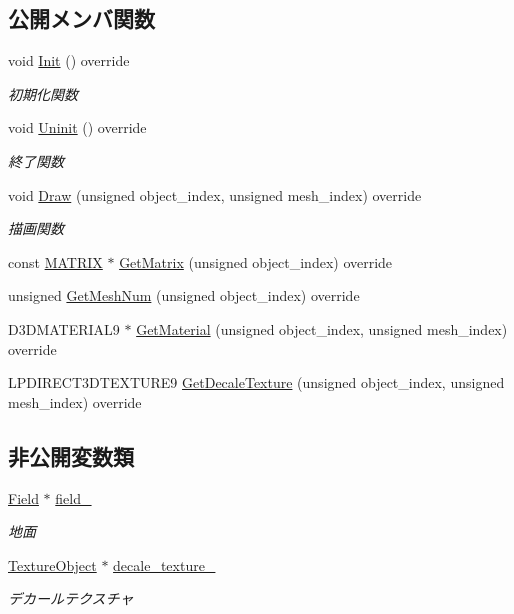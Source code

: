\subsection*{公開メンバ関数}
\begin{DoxyCompactItemize}
\item 
void \mbox{\hyperlink{class_field_draw_a4287d2ce33033b2413c1d3a81b173373}{Init}} () override
\begin{DoxyCompactList}\small\item\em 初期化関数 \end{DoxyCompactList}\item 
void \mbox{\hyperlink{class_field_draw_a89a78212c141714d9e39e25e663aaeff}{Uninit}} () override
\begin{DoxyCompactList}\small\item\em 終了関数 \end{DoxyCompactList}\item 
void \mbox{\hyperlink{class_field_draw_a1915497654d079074dbd3e058db06a78}{Draw}} (unsigned object\+\_\+index, unsigned mesh\+\_\+index) override
\begin{DoxyCompactList}\small\item\em 描画関数 \end{DoxyCompactList}\item 
const \mbox{\hyperlink{_vector3_d_8h_a032295cd9fb1b711757c90667278e744}{M\+A\+T\+R\+IX}} $\ast$ \mbox{\hyperlink{class_field_draw_a2629b4c4cd8e240e39c65b879c6e82b6}{Get\+Matrix}} (unsigned object\+\_\+index) override
\item 
unsigned \mbox{\hyperlink{class_field_draw_aeb54d8cba559ef615ee46c8a7bbd3b9f}{Get\+Mesh\+Num}} (unsigned object\+\_\+index) override
\item 
D3\+D\+M\+A\+T\+E\+R\+I\+A\+L9 $\ast$ \mbox{\hyperlink{class_field_draw_ab126f938895211ff170bc37045a8e7a2}{Get\+Material}} (unsigned object\+\_\+index, unsigned mesh\+\_\+index) override
\item 
L\+P\+D\+I\+R\+E\+C\+T3\+D\+T\+E\+X\+T\+U\+R\+E9 \mbox{\hyperlink{class_field_draw_a67eabcc5ffd6697b87e89a1c4ddb95f6}{Get\+Decale\+Texture}} (unsigned object\+\_\+index, unsigned mesh\+\_\+index) override
\end{DoxyCompactItemize}
\subsection*{非公開変数類}
\begin{DoxyCompactItemize}
\item 
\mbox{\hyperlink{class_field}{Field}} $\ast$ \mbox{\hyperlink{class_field_draw_a5d81171db83ea98a33c0e6f68b5dd351}{field\+\_\+}}
\begin{DoxyCompactList}\small\item\em 地面 \end{DoxyCompactList}\item 
\mbox{\hyperlink{class_texture_object}{Texture\+Object}} $\ast$ \mbox{\hyperlink{class_field_draw_a1d9e36a7e8d6dd8791d2dd82bceac28f}{decale\+\_\+texture\+\_\+}}
\begin{DoxyCompactList}\small\item\em デカールテクスチャ \end{DoxyCompactList}\end{DoxyCompactItemize}
